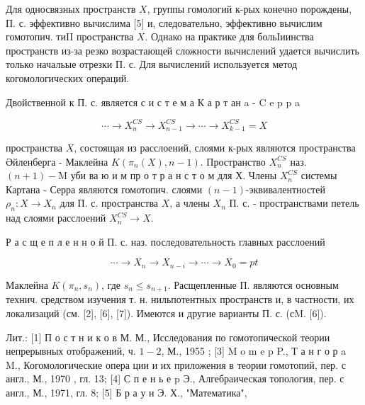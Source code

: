 \documentclass[10pt]{article}
\begin{document}
Для односвязных пространств $X$, группы гомологий к-рых конечно порождены, П. с. эффективно вычислима [5] и, следовательно, эффективно вычислим гомотопич. тиII пространства $X$. Однако на практике для больІиинства пространств из-за резко возрастающей сложности вычислений удается вычислить только начальые отрезки П. с. Для вычислений используется метод когомологических операций.



Двойственной к П. с. является с и с т е м а К а р т ан a - C e p p a



\[

\cdots \longrightarrow X_{n}^{C S} \rightarrow X_{n-1}^{C S} \longrightarrow \cdots \rightarrow X_{k-1}^{C S}=X

\]



пространства $X$, состоящая из расслоений, слоями к-рых являются пространства Әйленберга - Маклейна $K\left(\pi_{n}(X), n-1\right)$. Пространство $X_{n}^{C S}$ наз. $(n+1)-\mathrm{M}$ уби ва ю и м пр о т р а н с т о м для $Х$. Члены $X_{n}^{C S}$ системы Картана - Серра являются гомотопич. слоями $(n-1)$-эквивалентностей $\rho_{n}: X \rightarrow X_{n}$ для П. с. пространства $X$, а члены $X_{n}$ П. с. - пространствами петель над слоями расслоений $X_{n}^{C S} \rightarrow X$.



Р а с щ е п л е н н о й П. с. наз. последовательность главных расслоений



\[

\cdots \rightarrow X_{n} \longrightarrow X_{n-i} \longrightarrow \cdots \rightarrow X_{0}=p t

\]



Маклейна $K\left(\pi_{n}, s_{n}\right)$, где $s_{n} \leqslant s_{n+1}$. Расщепленные П. являются основным технич. средством изучения т. н. нильпотентных пространств и, в частности, их локализаций (см. [2], [6], [7]). Имеются и другие варианты П. с. (сM. [6]).



Лит.: [1] П о с т н и к о в М. М., Исследования по гомотопической теории непрерывных отображений, ч. $1-2$, М., 1955 ; [3] M o m e p P., Т а н г о р a M., Когомологические опера ции и их приложения в теории гомотопий, пер. с англ., М., 1970 , гл. 13; [4] С п е н ь е p Э., Алгебраическая топология, пер. с англ., М., 1971, гл. 8; [5] Б р а у н Э. Х., "Математика",
\end{document}
